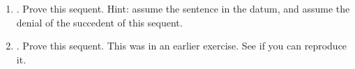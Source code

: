 \begin{enumerate}
\begin{enumerate}
\newpage

\item {}. Prove this sequent. Hint: assume the 
 sentence in the datum, and assume the denial of the succedent of this sequent.

 \opts{
\dotline
\dotline
\dotline
\dotline
\dotline
\dotline
\dotline
\dotline
\dotline
\dotline
\dotline
\dotline
\dotline
\dotline

 }
 {
\begin{argumentN}[1]










\end{argumentN}
}
   \item {}. Prove this sequent. This was in an earlier 
	exercise. See if you can reproduce it.


	\opts{
\dotline
\dotline
\dotline
\dotline
\dotline
\dotline
\dotline
\dotline
\dotline
\dotline
\dotline

}
{
\begin{argumentN}[1]








\end{argumentN}}
\end{enumerate}
\end{enumerate}
